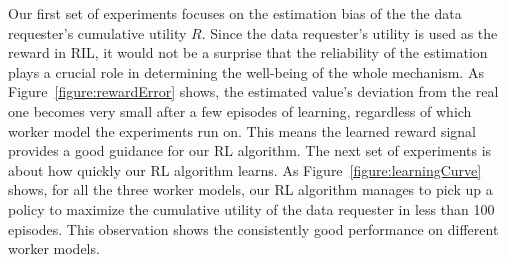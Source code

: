 %

Our first set of experiments focuses on the estimation bias of the the data requester's cumulative utility $R$.
Since the data requester's utility is used as the reward in RIL, it would not be a surprise that the reliability of the estimation plays a crucial role in determining the well-being of the whole mechanism. As Figure~\ref{figure:rewardError} shows, the estimated value's deviation from the real one becomes very small after a few episodes of learning, regardless of which worker model the experiments run on.
This means the learned reward signal provides a good guidance for our RL algorithm.
The next set of experiments is about how quickly our RL algorithm learns. As Figure~\ref{figure:learningCurve} shows, for all the three worker models, our RL algorithm manages to pick up a policy to maximize the cumulative utility of the data requester in less than 100 episodes. 
This observation shows the consistently good performance on different worker models.

